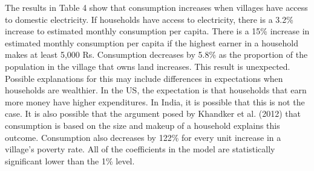 \documentclass[
]{article}
\begin{document}
The results in Table 4 show that consumption increases when villages
have access to domestic electricity. If households have access to
electricity, there is a 3.2\% increase to estimated monthly consumption
per capita. There is a 15\% increase in estimated monthly consumption
per capita if the highest earner in a household makes at least 5,000 Rs.
Consumption decreases by 5.8\% as the proportion of the population in
the village that owns land increases. This result is unexpected.
Possible explanations for this may include differences in expectations
when households are wealthier. In the US, the expectation is that
households that earn more money have higher expenditures. In India, it
is possible that this is not the case. It is also possible that the
argument posed by Khandker et al. (2012) that consumption is based on
the size and makeup of a household explains this outcome. Consumption
also decreases by 122\% for every unit increase in a village's poverty
rate. All of the coefficients in the model are statistically significant
lower than the 1\% level.
\end{document}
